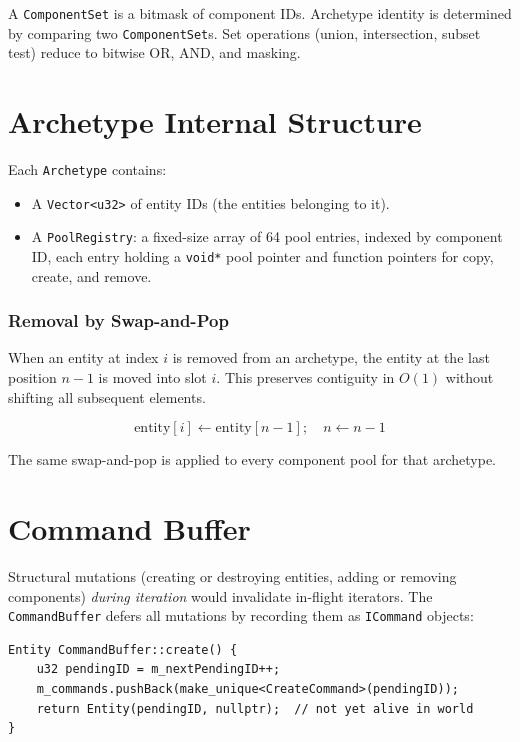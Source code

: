 \documentclass[12pt, a4paper]{report}
\theoremstyle{definition}
\theoremstyle{remark}
\begin{document}
A \texttt{ComponentSet} is a bitmask of component IDs. Archetype identity is
determined by comparing two \texttt{ComponentSet}s. Set operations (union,
intersection, subset test) reduce to bitwise OR, AND, and masking.

\section{Archetype Internal Structure}

Each \texttt{Archetype} contains:
\begin{itemize}
  \item A \texttt{Vector<u32>} of entity IDs (the entities belonging to it).
  \item A \texttt{PoolRegistry}: a fixed-size array of 64 pool entries,
        indexed by component ID, each entry holding a \texttt{void*} pool
        pointer and function pointers for copy, create, and remove.
\end{itemize}

\subsubsection{Removal by Swap-and-Pop}

When an entity at index $i$ is removed from an archetype, the entity at
the last position $n-1$ is moved into slot $i$. This preserves contiguity
in $O(1)$ without shifting all subsequent elements.

\begin{equation}
\text{entity}[i] \leftarrow \text{entity}[n-1]; \quad n \leftarrow n-1
\end{equation}

The same swap-and-pop is applied to every component pool for that
archetype.

\section{Command Buffer}

Structural mutations (creating or destroying entities, adding or removing
components) \emph{during iteration} would invalidate in-flight iterators.
The \texttt{CommandBuffer} defers all mutations by recording them as
\texttt{ICommand} objects:

\begin{lstlisting}[caption={Deferred entity creation}]
Entity CommandBuffer::create() {
    u32 pendingID = m_nextPendingID++;
    m_commands.pushBack(make_unique<CreateCommand>(pendingID));
    return Entity(pendingID, nullptr);  // not yet alive in world
}
\end{lstlisting}
\end{document}
